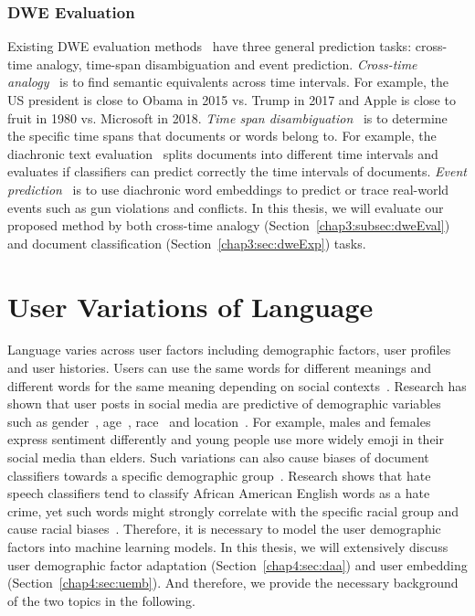 \subsubsection{DWE Evaluation}

Existing DWE evaluation methods~\cite{kutuzov2018diachronic} have three general prediction tasks: cross-time analogy, time-span disambiguation and event prediction.
\textit{Cross-time analogy}~\cite{szymanski2017temporal, yao2018dynamic} is to find semantic equivalents across time intervals.
For example, the US president is close to Obama in 2015 vs. Trump in 2017 and Apple is close to fruit in 1980 vs. Microsoft in 2018.
\textit{Time span disambiguation}~\cite{mihalcea2012word, popescu2015semeval} is to determine the specific time spans that documents or words belong to. 
For example, the diachronic text evaluation~\cite{popescu2015semeval} splits documents into different time intervals and evaluates if classifiers can predict correctly the time intervals of documents.
\textit{Event prediction}~\cite{kutuzov2017tracing} is to use diachronic word embeddings to predict or trace real-world events such as gun violations and conflicts.
In this thesis, we will evaluate our proposed method by both cross-time analogy (Section~\ref{chap3:subsec:dweEval}) and document classification (Section~\ref{chap3:sec:dweExp}) tasks.


\section{User Variations of Language}
\label{chap2:sec:demographic}


Language varies across user factors including demographic factors, user profiles and user histories. 
Users can use the same words for different meanings and different words for the same meaning depending on social contexts~\cite{oba2019modeling}. 
Research has shown that user posts in social media are predictive of demographic variables such as 
gender~\cite{rao2010classifying, rao2011hierarchical, burger2011discriminating, volkova2015inferring}, age~\cite{rosenthal2011age, hovy2015tagging, johannsen2015cross, zhang2016predicting, diaz2018addressing}, race~\cite{preoctiuc2018user} and location~\cite{eisenstein2010latent, wing2011simple, wing2014hierarchical}.
For example, males and females express sentiment differently and young people use more widely emoji in their social media than elders.
Such variations can also cause biases of document classifiers towards a specific demographic group~\cite{sun2019mitigating}.
Research shows that hate speech classifiers tend to classify African American English words as a hate crime, yet such words might strongly correlate with the specific racial group and cause racial biases~\cite{davidson2019racial, sap2019risk}.
Therefore, it is necessary to model the user demographic factors into machine learning models.
In this thesis, we will extensively discuss user demographic factor adaptation (Section~\ref{chap4:sec:daa}) and user embedding (Section~\ref{chap4:sec:uemb}).
And therefore, we provide the necessary background of the two topics in the following.



